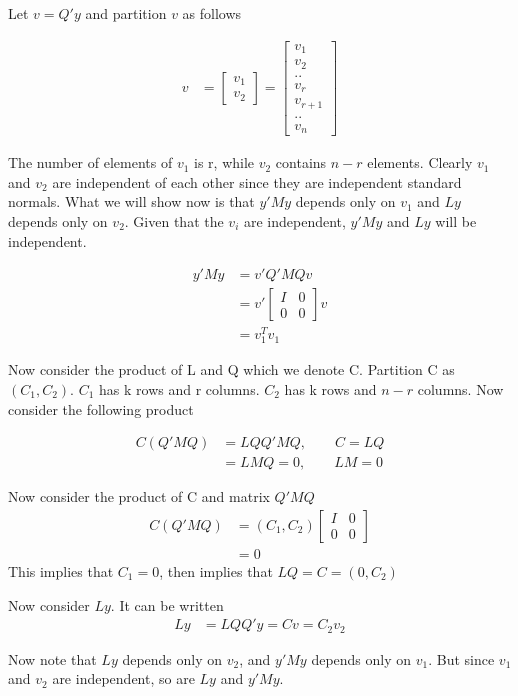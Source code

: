 \begin{itemize}
Let $v = Q' y$ and partition $v$ as follows

 \begin{align*}
	v &=  \begin{bmatrix}
	v_1\\
	v_2
	\end{bmatrix} = \begin{bmatrix}
	v_1\\
	v_2 \\
	..\\
	v_r \\
	v_{r+1}\\
	..\\
	v_n
	\end{bmatrix} 
\end{align*}

The number of elements of $v_1$ is r, while $v_2$ contains $n-r$ elements. Clearly $v_1$ and $v_2$ are independent of each other since they are independent standard normals. What we will show now is that $y' M y$ depends only on $v_1$ and $Ly$ depends only on $v_2$. Given that the $v_i$ are independent, $y' M y$ and $Ly$ will be independent. 

 \begin{align*}
	y'My &= v' Q' M Q v \\
	&= v' \begin{bmatrix}
	I & 0\\
	0 & 0
	\end{bmatrix} v \\
	&= v_1^T v_1
\end{align*}

Now consider the product of L and Q which we denote C. Partition C as $(C_1, C_2)$. $C_1$ has k rows and r columns. $C_2$ has k rows and $n-r$ columns. Now consider the following product

  \begin{align*}
	C(Q' M Q) &= L Q Q'  M Q, \qquad C=LQ\\
	&= LMQ = 0, \qquad LM = 0 
\end{align*}

Now consider the product of C and matrix $Q'MQ$
  \begin{align*}
	C(Q' M Q) &= (C_1, C_2) \begin{bmatrix}
	I & 0\\
	0 & 0
	\end{bmatrix} \\
	&= 0
\end{align*}
This implies that $C_1 = 0$, then implies that $LQ = C = (0, C_2)$

Now consider $Ly$. It can be written 
  \begin{align*}
	Ly&= LQQ'y = C v = C_2 v_2
\end{align*}

Now note that $Ly$ depends only on $v_2$, and $y'My$ depends only on $v_1$. But since $v_1$ and $v_2$ are independent, so are $Ly$ and $y'My$.




\end{itemize}
